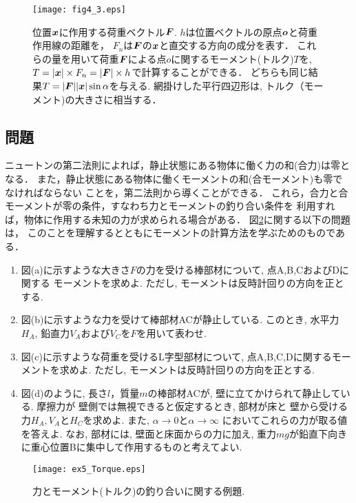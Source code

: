 \documentclass[10pt,a4j]{jbook}
\begin{document}
\begin{figure}[h]
	\begin{center}
	\texttt{[image: fig4\_3.eps]} 
	\end{center}
	\caption{
	位置$\mbox{\boldmath $x$}$に作用する荷重ベクトル$\mbox{\boldmath $F$}$.
	$h$は位置ベクトルの原点$\mbox{\boldmath $o$}$と荷重作用線の距離を，
	$F_n$は$\mbox{\boldmath $F$}$の$\mbox{\boldmath $x$}$と直交する方向の成分を表す．
	これらの量を用いて荷重$\mbox{\boldmath $F$}$による点$o$に関するモーメント(トルク)$T$を,
	$T=|\mbox{\boldmath $x$}|\times F_n=|\mbox{\boldmath $F$}|\times h$で計算することができる．
	どちらも同じ結果$T=|\mbox{\boldmath $F$}| |\mbox{\boldmath $x$}|\sin\alpha$を与える.
	網掛けした平行四辺形は, トルク（モーメント)の大きさに相当する．
	 } 
	\label{fig:fig4_2}
\end{figure}
\subsection{問題}
ニュートンの第二法則によれば，静止状態にある物体に働く力の和(合力)は零となる．
また，静止状態にある物体に働くモーメントの和(合モーメント)も零でなければならない
ことを，第二法則から導くことができる．
これら，合力と合モーメントが零の条件，すなわち力とモーメントの釣り合い条件を
利用すれば，物体に作用する未知の力が求められる場合がある．
図\ref{fig:ex5_Torque}に関する以下の問題は，
このことを理解するとともにモーメントの計算方法を学ぶためのものである．
\begin{enumerate}
\item
図(a)に示すような大きさ$F$の力を受ける棒部材について, 点A,B,CおよびDに関する
モーメントを求めよ. ただし, モーメントは反時計回りの方向を正とする. 
\item
図(b)に示すような力を受けて棒部材ACが静止している. このとき, 水平力$H_A$, 
鉛直力$V_A$および$V_C$を$F$を用いて表わせ. 
\item
図(c)に示すような荷重を受けるL字型部材について, 点A,B,C,Dに関するモーメントを求めよ. 
ただし, モーメントは反時計回りの方向を正とする. 
\item
図(d)のように, 長さ$l$，質量$m$の棒部材ACが, 壁に立てかけられて静止している. 
摩擦力が 壁側では無視できると仮定するとき, 部材が床と
壁から受ける力$H_A, V_A$と$H_C$を求めよ. また, $\alpha\rightarrow 0$と$\alpha \rightarrow \infty$
においてこれらの力が取る値を答えよ. なお, 部材には, 壁面と床面からの力に加え, 
重力$mg$が鉛直下向きに重心位置Bに集中して作用するものと考えてよい. 
\end{enumerate}
\begin{figure}[h]
	\begin{center}
	\texttt{[image: ex5\_Torque.eps]} 
	\end{center}
	\caption{力とモーメント(トルク)の釣り合いに関する例題.} 
	\label{fig:ex5_Torque}
\end{figure}
\end{document}
